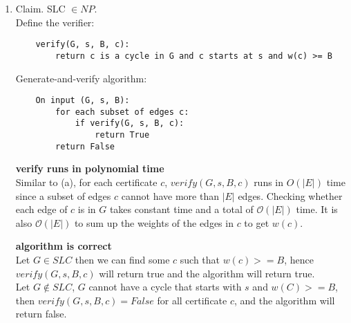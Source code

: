 \documentclass[11pt]{article}
\begin{document}
\begin{enumerate}
\begin{enumerate}
\item Claim. SLC $\in NP$.\\
        Define the verifier:
    \begin{lstlisting}
    verify(G, s, B, c):
        return c is a cycle in G and c starts at s and w(c) >= B
    \end{lstlisting}
    Generate-and-verify algorithm:
    \begin{lstlisting}
    On input (G, s, B):
        for each subset of edges c:
            if verify(G, s, B, c):
                return True
        return False
    \end{lstlisting}
    \textbf{verify runs in polynomial time} \\
    Similar to (a), for each certificate $c$, $verify(G, s, B, c)$ runs in $O(|E|)$ time since a subset of edges $c$ cannot have more than $|E|$ edges. Checking whether each edge of $c$ is in $G$ takes constant time and a total of $\mathcal{O}(|E|)$ time. It is also $\mathcal{O}(|E|)$ to sum up the weights of the edges in $c$ to get $w(c)$. 
    
    \textbf{algorithm is correct}\\
    Let $G \in SLC$ then we can find some $c$ such that $w(c) >= B$, hence $verify(G, s, B, c)$ will return true and the algorithm will return true. \\ 
    Let $G \not\in SLC$, $G$ cannot have a cycle that starts with $s$ and $w(C)>= B$, then $verify(G, s, B, c)=False$ for all certificate $c$,  and the algorithm will return false.\\
    

\end{enumerate}
\end{enumerate}
\end{document}
